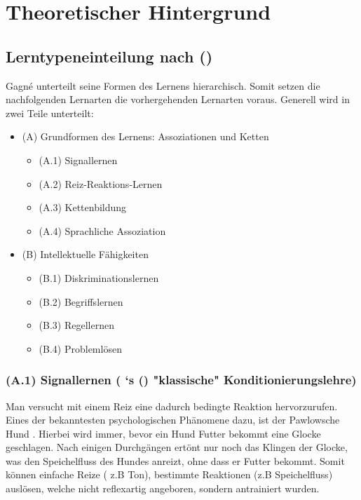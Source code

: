 \chapter{Theoretischer Hintergrund}

\section{Lerntypeneinteilung nach \citeauthor{gagnebedingung} ()}

Gagné unterteilt seine Formen des Lernens hierarchisch. Somit setzen die nachfolgenden Lernarten die vorhergehenden Lernarten voraus. Generell wird in zwei Teile unterteilt: 


\begin{itemize}
\item (A) Grundformen des Lernens: Assoziationen und Ketten 
    \begin{itemize}
        \item (A.1) Signallernen
        \item (A.2) Reiz-Reaktions-Lernen
        \item (A.3) Kettenbildung
        \item (A.4) Sprachliche Assoziation
    \end{itemize}
\item (B) Intellektuelle Fähigkeiten
    \begin{itemize}
        \item (B.1) Diskriminationslernen
        \item (B.2) Begriffslernen
        \item (B.3) Regellernen 
        \item (B.4) Problemlösen
    \end{itemize}
\end{itemize}

\subsection[]{(A.1) Signallernen (\citeauthor{pawlow1977klassische} `s () "klassische" Konditionierungslehre)}

Man versucht mit einem Reiz eine dadurch bedingte Reaktion hervorzurufen. Eines der bekanntesten psychologischen Phänomene dazu, ist der \grqq Pawlowsche Hund \grqq. Hierbei wird immer, bevor ein Hund Futter bekommt eine Glocke geschlagen. Nach einigen Durchgängen ertönt nur noch das Klingen der Glocke, was den Speichelfluss des Hundes anreizt, ohne dass er Futter bekommt. Somit können einfache Reize ( z.B Ton), bestimmte Reaktionen (z.B Speichelfluss) auslösen, welche nicht reflexartig angeboren, sondern antrainiert wurden.

